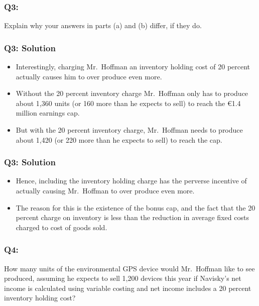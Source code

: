 \hypertarget{q3-2}{%
\subsubsection{Q3:}\label{q3-2}}

Explain why your answers in parts (a) and (b) differ, if they do.

\hypertarget{q3-solution-1}{%
\subsubsection{Q3: Solution}\label{q3-solution-1}}

\begin{itemize}
\tightlist
\item
  Interestingly, charging Mr.~Hoffman an inventory holding cost of 20
  percent actually causes him to over produce even more.
\item
  Without the 20 percent inventory charge Mr.~Hoffman only has to
  produce about 1,360 units (or 160 more than he expects to sell) to
  reach the €1.4 million earnings cap.
\item
  But with the 20 percent inventory charge, Mr.~Hoffman needs to produce
  about 1,420 (or 220 more than he expects to sell) to reach the cap.
\end{itemize}

\hypertarget{q3-solution-2}{%
\subsubsection{Q3: Solution}\label{q3-solution-2}}

\begin{itemize}
\tightlist
\item
  Hence, including the inventory holding charge has the perverse
  incentive of actually causing Mr.~Hoffman to over produce even more.
\item
  The reason for this is the existence of the bonus cap, and the fact
  that the 20 percent charge on inventory is less than the reduction in
  average fixed costs charged to cost of goods sold.
\end{itemize}

\hypertarget{q4-1}{%
\subsubsection{Q4:}\label{q4-1}}

How many units of the environmental GPS device would Mr.~Hoffman like to
see produced, assuming he expects to sell 1,200 devices this year if
Navisky's net income is calculated using variable costing and net income
includes a 20 percent inventory holding cost?

